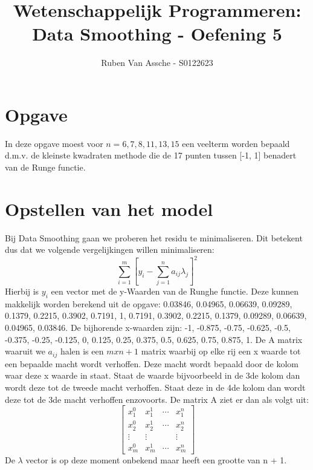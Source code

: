 \documentclass[10pt,a4paper]{article}
\author{Ruben Van Assche - S0122623}
\title{Wetenschappelijk Programmeren: Data Smoothing - Oefening 5}
\begin{document}
\maketitle
\section{Opgave}
In deze opgave moest voor $n = 6, 7, 8, 11, 13, 15$ een veelterm worden bepaald d.m.v. de kleinste kwadraten methode die de 17 punten tussen [-1, 1] benadert van de Runge functie.

\section{Opstellen van het model}
Bij Data Smoothing gaan we proberen het residu te minimaliseren. Dit betekent dus dat we volgende vergelijkingen willen minimaliseren:
$$ \sum_{i = 1}^{m} \left [ y_{i} - \sum_{j = 1}^{n} a_{ij} \lambda_{j}  \right ]^{2} $$
Hierbij is $y_{i}$ een vector met de y-Waarden van de Runghe functie. Deze kunnen makkelijk worden berekend uit de opgave: 0.03846, 0.04965, 0.06639, 0.09289, 0.1379, 0.2215, 0.3902, 0.7191, 1, 0.7191, 0.3902, 0.2215, 0.1379, 0.09289, 0.06639, 0.04965, 0.03846.
\newline
\newline
De bijhorende x-waarden zijn: -1, -0.875, -0.75, -0.625, -0.5, -0.375, -0.25, -0.125, 0, 0.125, 0.25, 0.375, 0.5, 0.625, 0.75, 0.875, 1.
\newline
\newline
De A matrix waaruit we $a_{ij}$ halen is een $m x n+1$ matrix waarbij op elke rij een x waarde tot een bepaalde macht wordt verhoffen. Deze macht wordt bepaald door de kolom waar deze x waarde in staat. Staat de waarde bijvoorbeeld in de 3de kolom dan wordt deze tot de tweede macht verhoffen. Staat deze in de 4de kolom dan wordt deze tot de 3de macht verhoffen enzovoorts.
\newline
\newline
De matrix A ziet er dan als volgt uit:
$$
\begin{bmatrix}
x_{1}^{0} & x_{1}^{1}  & \cdots  & x_{1}^{n} \\ 
x_{2}^{0} &x_{2}^{1}   & \cdots  & x_{2}^{n} \\ 
\vdots  &\vdots   &  & \vdots  \\ 
x_{m}^{0} & x_{m}^{1}  & \cdots  & x_{m}^{n} 
\end{bmatrix}
$$
De $\lambda$ vector is op deze moment onbekend maar heeft een grootte van n + 1.
\end{document}
